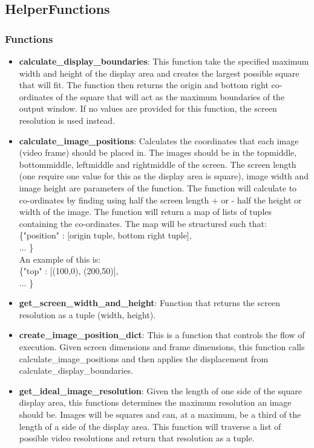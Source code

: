 \documentclass{article}
\begin{document}
\subsection{HelperFunctions}
\subsubsection{Functions}

\begin{itemize}
	\item \textbf{calculate\_display\_boundaries}: This function take the specified maximum width and height of the display area and creates the largest possible square that will fit. The function then returns the origin and bottom right co-ordinates of the square that will act as the maximum boundaries of the output window. If no values are provided for this function, the screen resolution is used instead.
	
	\item \textbf{calculate\_image\_positions}: Calculates the co\-ordinates that each image (video frame) should be placed in. The images should be in the top\-middle, bottom\-middle, left\-middle and right\-middle of the screen. The screen length (one require one value for this as the display area is square), image width and image height are parameters of the function. The function will calculate to co-ordinates by finding using half the screen length + or - half the height or width of the image. The function will return a map of lists of tuples containing the co-ordinates. The map will be structured such that: \\
	\{"position" : [origin tuple, bottom right tuple],\\... \} \\
	An example of this is: \\
	\{"top" : [(100,0), (200,50)],\\... \}
	
	\item \textbf{get\_screen\_width\_and\_height}: Function that returns the screen resolution as a tuple (width, height). 
	
	\item \textbf{create\_image\_position\_dict}: This is a function that controls the flow of execution. Given screen dimensions and frame dimensions, this function calls calculate\_image\_positions and then applies the displacement from calculate\_display\_boundaries.
	
	\item \textbf{get\_ideal\_image\_resolution}: Given the length of one side of the square display area, this functions determines the maximum resolution an image should be. Images will be squares and can, at a maximum, be a third of the length of a side of the display area. This function will traverse a list of possible video resolutions and return that resolution as a tuple.

\end{itemize}
\end{document}
